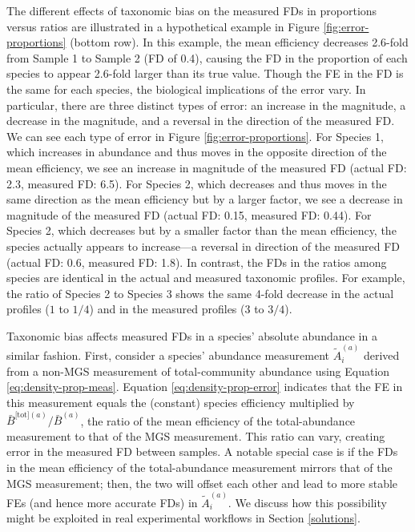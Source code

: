 \documentclass[
]{article}
\begin{document}
The different effects of taxonomic bias on the measured FDs in proportions versus ratios are illustrated in a hypothetical example in Figure \ref{fig:error-proportions} (bottom row).
In this example, the mean efficiency decreases 2.6-fold from Sample 1 to Sample 2 (FD of 0.4), causing the FD in the proportion of each species to appear 2.6-fold larger than its true value.
Though the FE in the FD is the same for each species, the biological implications of the error vary.
In particular, there are three distinct types of error: an increase in the magnitude, a decrease in the magnitude, and a reversal in the direction of the measured FD.
We can see each type of error in Figure \ref{fig:error-proportions}.
For Species 1, which increases in abundance and thus moves in the opposite direction of the mean efficiency, we see an increase in magnitude of the measured FD (actual FD: 2.3, measured FD: 6.5).
For Species 2, which decreases and thus moves in the same direction as the mean efficiency but by a larger factor, we see a decrease in magnitude of the measured FD (actual FD: 0.15, measured FD: 0.44).
For Species 2, which decreases but by a smaller factor than the mean efficiency, the species actually appears to increase---a reversal in direction of the measured FD (actual FD: 0.6, measured FD: 1.8).
In contrast, the FDs in the ratios among species are identical in the actual and measured taxonomic profiles.
For example, the ratio of Species 2 to Species 3 shows the same 4-fold decrease in the actual profiles (\(1\) to \(1/4\)) and in the measured profiles (\(3\) to \(3/4\)).

Taxonomic bias affects measured FDs in a species' absolute abundance in a similar fashion.
First, consider a species' abundance measurement \(\tilde A_i^{(a)}\) derived from a non-MGS measurement of total-community abundance using Equation \eqref{eq:density-prop-meas}.
Equation \eqref{eq:density-prop-error} indicates that the FE in this measurement equals the (constant) species efficiency multiplied by \({\bar B^{{\text{[tot]}}(a)}}/{\bar B^{(a)}}\), the ratio of the mean efficiency of the total-abundance measurement to that of the MGS measurement.
This ratio can vary, creating error in the measured FD between samples.
A notable special case is if the FDs in the mean efficiency of the total-abundance measurement mirrors that of the MGS measurement; then, the two will offset each other and lead to more stable FEs (and hence more accurate FDs) in \(\tilde A_i^{(a)}\).
We discuss how this possibility might be exploited in real experimental workflows in Section \ref{solutions}.
\end{document}
